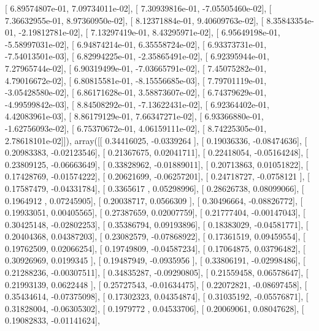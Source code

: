 \documentclass{article}
\begin{document}
       [  6.89574807e-01,   7.09734011e-02],
       [  7.30939816e-01,  -7.05505460e-02],
       [  7.36632955e-01,   8.97360950e-02],
       [  8.12371884e-01,   9.40609763e-02],
       [  8.35843354e-01,  -2.19812781e-02],
       [  7.13297419e-01,   8.43295971e-02],
       [  6.95649198e-01,  -5.58997031e-02],
       [  6.94874214e-01,   6.35558724e-02],
       [  6.93373731e-01,  -7.54013501e-03],
       [  6.82994225e-01,  -2.35865491e-02],
       [  6.92395944e-01,   7.27965744e-02],
       [  6.90319499e-01,  -7.03665791e-02],
       [  7.45075282e-01,   4.79016672e-02],
       [  6.80815581e-01,  -8.15556685e-03],
       [  7.79701119e-01,  -3.05428580e-02],
       [  6.86171628e-01,   3.58873607e-02],
       [  6.74379629e-01,  -4.99599842e-03],
       [  8.84508292e-01,  -7.13622431e-02],
       [  6.92364402e-01,   4.42083961e-03],
       [  8.86179129e-01,   7.66347271e-02],
       [  6.93366880e-01,  -1.62756093e-02],
       [  6.75370672e-01,   4.06159111e-02],
       [  8.74225305e-01,   2.78618101e-02]]), array([[ 0.34416025, -0.0339264 ],
       [ 0.19036336, -0.08474636],
       [ 0.20983383, -0.02123546],
       [ 0.21367675,  0.02041711],
       [ 0.22418054, -0.05164248],
       [ 0.23809125, -0.06663649],
       [ 0.33828962, -0.01889011],
       [ 0.20713863,  0.01051822],
       [ 0.17428769, -0.01574222],
       [ 0.20621699, -0.06257201],
       [ 0.24718727, -0.0758121 ],
       [ 0.17587479, -0.04331784],
       [ 0.3365617 ,  0.05298996],
       [ 0.28626738,  0.08099066],
       [ 0.1964912 ,  0.07245905],
       [ 0.20038717,  0.0566309 ],
       [ 0.30496664, -0.08826772],
       [ 0.19933051,  0.00405565],
       [ 0.27387659,  0.02007759],
       [ 0.21777404, -0.00147043],
       [ 0.30425148, -0.02802253],
       [ 0.35386794,  0.09193896],
       [ 0.18383029, -0.04581771],
       [ 0.20404368,  0.04387203],
       [ 0.23082579, -0.07868922],
       [ 0.17361519,  0.09459554],
       [ 0.19762509,  0.02066254],
       [ 0.19749809, -0.04587234],
       [ 0.17064875,  0.03796482],
       [ 0.30926969,  0.0199345 ],
       [ 0.19487949, -0.0935956 ],
       [ 0.33806191, -0.02998486],
       [ 0.21288236, -0.00307511],
       [ 0.34835287, -0.09290805],
       [ 0.21559458,  0.06578647],
       [ 0.21993139,  0.0622448 ],
       [ 0.25727543, -0.01634475],
       [ 0.22072821, -0.08697458],
       [ 0.35434614, -0.07375098],
       [ 0.17302323,  0.04354874],
       [ 0.31035192, -0.05576871],
       [ 0.31828004, -0.06305302],
       [ 0.1979772 ,  0.04533706],
       [ 0.20069061,  0.08047628],
       [ 0.19082833, -0.01141624],
\end{document}
